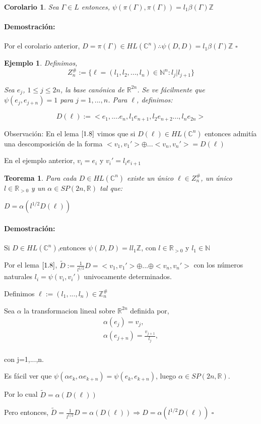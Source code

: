 \documentclass[12pt]{article}
\newtheorem{theorem}{Teorema}
\newtheorem{corollary}{Corolario}
\newtheorem{example}{Ejemplo}
\newenvironment{proof}{\paragraph{Demostración:}}{\hfill$\square$}
\begin{document}
 \begin{corollary}
  Sea $\Gamma  \in L$ entonces, $\psi(\pi(\Gamma),\pi(\Gamma))=l_1 \beta(\Gamma) \mathbb{Z}$  
 \end{corollary}
 \begin{proof}
  Por el corolario anterior, $D=\pi(\Gamma) \in HL(\mathbb{C}^n) \therefore \psi(D,D)=l_1 \beta(\Gamma) \mathbb{Z}$  
 \end{proof}


\begin{example} 
 Definimos,
 $$Z_n^{\#}:= \{ \ell=(l_1,l_2,...,l_n) \in \mathbb{N}^n:l_j|l_{j+1} \}$$
 
 Sea $e_j$, $1\leq j \leq 2n $,  la base canónica de $\mathbb{R}^{2n}$. Se ve fácilmente que $\psi(e_j,e_{j+n})=1$
 para $j=1,...,n$. Para $\ell$, definimos:
 
 $$D(\ell):=<e_1,....e_n,l_1 e_{n+1},l_2 e_{n+2}...,l_n e_{2n}>$$
  
 
 
\end{example}

 Observación: En el lema $\ref{1.8}$ vimos que si $D(\ell) \in HL(\mathbb{C}^n)$ entonces admitía una descomposición de la forma 
 $<v_1,v_1'>\oplus ... <v_n,v_n'>= D(\ell)$
 
 En el ejemplo anterior, $v_i=e_i$ y $v_i'=l_i e_{i+1}$
 

\begin{theorem}
 Para cada $D \in HL(\mathbb{C}^n)$ existe un único $\ell \in Z_n^{\#}$, un único $l \in \mathbb{R}_{>0}$ y un $\alpha \in SP(2n,\mathbb{R})$ tal que:
 
 $D=\alpha(l^{1/2} D(\ell))$
\end{theorem}

\begin{proof}
 Si $D \in HL(\mathbb{C}^n)$,entonces $ \psi(D,D)=l l_1 \mathbb{Z}$, con $l \in \mathbb{R}_{>0}$ y $l_1 \in \mathbb{N}$ 
 
 Por el lema $\ref{1.8}$, $\tilde{D}:= \frac{1}{l^{1/2}} D =  <v_1,v_1'> \oplus...\oplus <v_n,v_n'>$
 con los números naturales $l_i=\psi(v_i,v_i')$ univocamente determinados.

 Definimos $\ell:=(l_1,...,l_n) \in \mathbb{Z}_n^{\#}$
 
  
 
 Sea $\alpha$ la transformacion lineal sobre $\mathbb{R}^{2n}$ definida por, 
 $$
 \begin{aligned}
 \alpha(e_j)=v_j,\\
 \alpha(e_{j+n})=\frac{v_{j+1}}{l_j},\\
 \end{aligned}$$
 
 con j=1,...,n.
 
 
Es fácil ver que $\psi(\alpha e_k,\alpha e_{k+n})=\psi(e_k,e_{k+n})$, luego $\alpha \in  SP(2n,\mathbb{R})$.

Por lo cual  $\tilde{D} = \alpha(D(\ell)) $

Pero entonces, $\tilde{D}=\frac{1}{l^{1/2}} D = \alpha(D(\ell)) \Rightarrow D=\alpha(l^{1/2} D(\ell))$
\end{proof}
\end{document}

